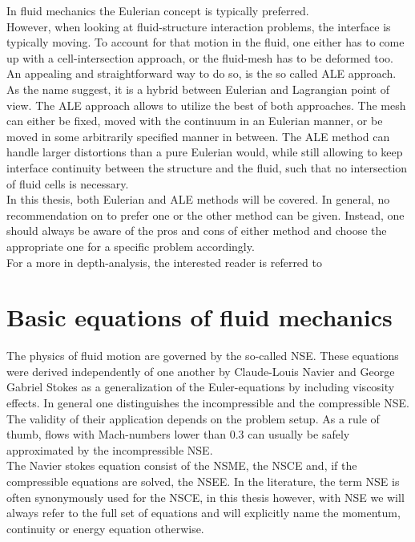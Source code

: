 \documentclass[../main.tex]{subfiles}
\begin{document}
In fluid mechanics the Eulerian concept is typically preferred.\\
However, when looking at fluid-structure interaction problems, the interface is typically moving. To account for that motion in the fluid, one either has to come up with a cell-intersection approach, or the fluid-mesh has to be deformed too.\\
An appealing and straightforward way to do so, is the so called \acf{ALE} approach. As the name suggest, it is a hybrid between Eulerian and Lagrangian point of view. The \ac{ALE} approach allows to utilize the best of both approaches. The mesh can either be fixed, moved with the continuum in an Eulerian manner, or be moved in some arbitrarily specified manner in between. The \ac{ALE} method can handle larger distortions than a pure Eulerian would, while still allowing to keep interface continuity between the structure and the fluid, such that no intersection of fluid cells is necessary.\\
In this thesis, both Eulerian and \ac{ALE} methods will be covered. In general, no recommendation on to prefer one or the other method can be given. Instead, one should always be aware of the pros and cons of either method and choose the appropriate one for a specific problem accordingly.\\
For a more in depth-analysis, the interested reader is referred to~\cite{LeVeque1992}


\section{Basic equations of fluid mechanics}\label{sec:fluid_equations_basic}

The physics of fluid motion are governed by the so-called \acf{NSE}. These equations were derived independently of one another by Claude-Louis Navier and George Gabriel Stokes as a generalization of the Euler-equations by including viscosity effects.
In general one distinguishes the incompressible and the compressible \ac{NSE}. The validity of their application depends on the problem setup. As a rule of thumb, flows with Mach-numbers lower than $0.3$ can usually be safely approximated by the incompressible \ac{NSE}.\\
The Navier stokes equation consist of the \acf{NSME}, the \ac{NSCE} and, if the compressible equations are solved, the \ac{NSEE}. In the literature, the term \ac{NSE} is often synonymously used for the \ac{NSCE}, in this thesis however, with \ac{NSE} we will always refer to the full set of equations and will explicitly name the momentum, continuity or energy equation otherwise.
\end{document}
